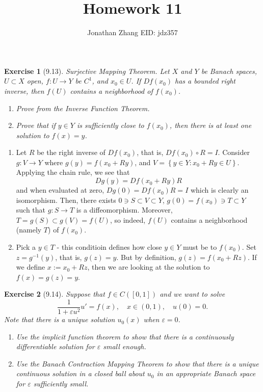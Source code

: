 \documentclass[letterpaper,twoside,11pt]{article}
\theoremstyle{mystyle}
\newtheorem*{exercise}{Exercise}
\newcommand{\cbk}{\color{black}}
\newcommand{\cblu}{\color{blue}}
\newcommand{\inv}{^{-1}}
\newcommand{\ve}{\varepsilon}
\begin{document}
\selectfont     %
\title{\vspace{-2\baselineskip} 
Homework 11
}
\author{Jonathan Zhang \qquad EID: { jdz357} }
\date{}
\maketitle


\begin{exercise}[9.13]
  Surjective Mapping Theorem. Let $X$ and $Y$ be Banach spaces, $U\subset X$ open, $f:U\to Y$ be $C^1$, and $x_0 \in U$. If $Df(x_0)$ has a bounded right inverse, then $f(U)$ contains a neighborhood of $f(x_0)$. 
  \begin{enumerate}
    \item Prove from the Inverse Function Theorem. 
    \item Prove that if $y\in Y$ is sufficiently close to $f(x_0)$, then there is at least one solution to $f(x) = y$. 
  \end{enumerate}
\end{exercise}

\cblu 
\begin{enumerate}
  \item Let $R$ be the right inverse of $Df(x_0)$, that is, $Df(x_0) \circ R = I$. Consider $g:V\to Y$ where $g(y) = f(x_0 + Ry)$, and $V = \left\{ y \in Y: x_0 + Ry \in U \right\}$. Applying the chain rule, we see that 
  \[Dg(y) = Df(x_0 + Ry) R\]
  and when evaluated at zero, $Dg(0) = Df(x_0) R = I$ which is clearly an isomorphism. Then, there exists $0 \ni S \subset V \subset Y$, $g(0) = f(x_0) \ni T \subset Y$ such that $g : S \to T$ is a diffeomorphism. Moreover, $T = g(S) \subset g(V) = f(U)$, so indeed, $f(U)$ contains a neighborhood (namely $T$) of $f(x_0)$. 
  \item Pick a $y \in T$ - this conditioin defines how close $y \in Y$ must be to $f(x_0)$. Set $z = g\inv (y)$, that is, $g(z) = y$. But by definition, $g(z) = f(x_0 + Rz)$. If we define $x := x_0 + Rz$, then we are looking at the solution to $f(x) = g(z) = y$. 
\end{enumerate}
\cbk 

\begin{exercise}[9.14]
  Suppose that $f \in C\left( [0,1] \right)$ and we want to solve 
  \[\frac{1}{1 + \ve u^2} u ' = f(x), \quad x \in (0,1), \quad u(0) = 0.\]
  Note that there is a unique solution $u_0(x)$ when $\ve = 0$. 
\begin{enumerate}
  \item Use the implicit function theorem to show that there is a continuously differentiable solution for $\ve$ small enough. 
  \item Use the Banach Contraction Mapping Theorem to show that there is a unique continuous solution in a closed ball about $u_0$ in an appropriate Banach space for $\ve$ sufficiently small. 
\end{enumerate}
\end{exercise}
\end{document}
